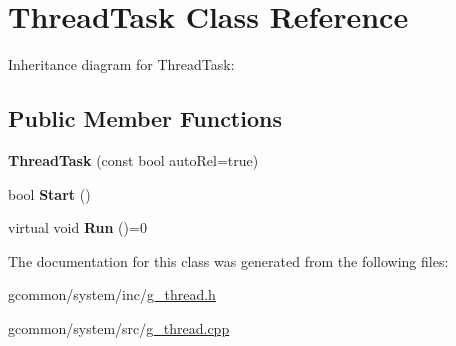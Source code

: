 \hypertarget{class_thread_task}{\section{Thread\-Task Class Reference}
\label{class_thread_task}
}


Inheritance diagram for Thread\-Task\-:
\subsection*{Public Member Functions}
\begin{DoxyCompactItemize}
\item 
\hypertarget{class_thread_task_a6ac7dc2f3a7c59e9abd779a6400db0a3}{{\bfseries Thread\-Task} (const bool auto\-Rel=true)}\label{class_thread_task_a6ac7dc2f3a7c59e9abd779a6400db0a3}

\item 
\hypertarget{class_thread_task_a8f7dc8fec979f702b680c092941bc0c0}{bool {\bfseries Start} ()}\label{class_thread_task_a8f7dc8fec979f702b680c092941bc0c0}

\item 
\hypertarget{class_thread_task_abd334c0d855349f19164e081723449ad}{virtual void {\bfseries Run} ()=0}\label{class_thread_task_abd334c0d855349f19164e081723449ad}

\end{DoxyCompactItemize}


The documentation for this class was generated from the following files\-:\begin{DoxyCompactItemize}
\item 
gcommon/system/inc/\hyperlink{g__thread_8h}{g\-\_\-thread.\-h}\item 
gcommon/system/src/\hyperlink{g__thread_8cpp}{g\-\_\-thread.\-cpp}\end{DoxyCompactItemize}
